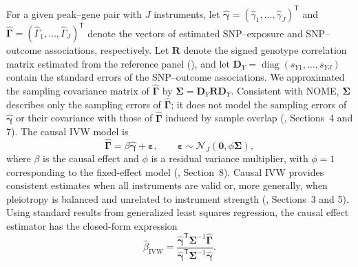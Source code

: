 \noindent For a given peak--gene pair with $J$ instruments, let $\hat{\boldsymbol{\gamma}}=(\hat{\gamma}_1,\ldots,\hat{\gamma}_J)^{\mathsf T}$ and $\hat{\boldsymbol{\Gamma}}=(\hat{\Gamma}_1,\ldots,\hat{\Gamma}_J)^{\mathsf T}$ denote the vectors of estimated SNP--exposure and SNP--outcome associations, respectively. Let $\boldsymbol R$ denote the signed genotype correlation matrix estimated from the reference panel (), and let $\boldsymbol D_Y=\operatorname{diag}(s_{Y1},\ldots,s_{YJ})$ contain the standard errors of the SNP--outcome associations. We approximated the sampling covariance matrix of $\hat{\boldsymbol{\Gamma}}$ by $\boldsymbol{\Sigma}=\boldsymbol D_Y\boldsymbol R\boldsymbol D_Y$. Consistent with NOME, $\boldsymbol{\Sigma}$ describes only the sampling errors of $\hat{\boldsymbol{\Gamma}}$; it does not model the sampling errors of $\hat{\boldsymbol{\gamma}}$ or their covariance with those of $\hat{\boldsymbol{\Gamma}}$ induced by sample overlap (, Sections~4 and 7). The causal IVW model is
\begin{equation*}
\hat{\boldsymbol{\Gamma}}
=
\beta\hat{\boldsymbol{\gamma}}+\boldsymbol{\varepsilon},
\qquad
\boldsymbol{\varepsilon}
\sim\mathcal{N}_J
(\boldsymbol 0,\phi\boldsymbol{\Sigma}),
\end{equation*}
where \(\beta\) is the causal effect and \(\phi\) is a residual variance multiplier, with \(\phi=1\) corresponding to the fixed-effect model (, Section~8). Causal IVW provides consistent estimates when all instruments are valid or, more generally, when pleiotropy is balanced and unrelated to instrument strength (, Sections~3 and 5). Using standard results from generalized least squares regression, the causal effect estimator has the closed-form expression
\begin{equation*}
\hat{\beta}_{\text{IVW}}
=
\frac{
\hat{\boldsymbol{\gamma}}^{\mathsf T}
\boldsymbol{\Sigma}^{-1}\hat{\boldsymbol{\Gamma}}
}{
\hat{\boldsymbol{\gamma}}^{\mathsf T}
\boldsymbol{\Sigma}^{-1}\hat{\boldsymbol{\gamma}}
}.
\end{equation*}

